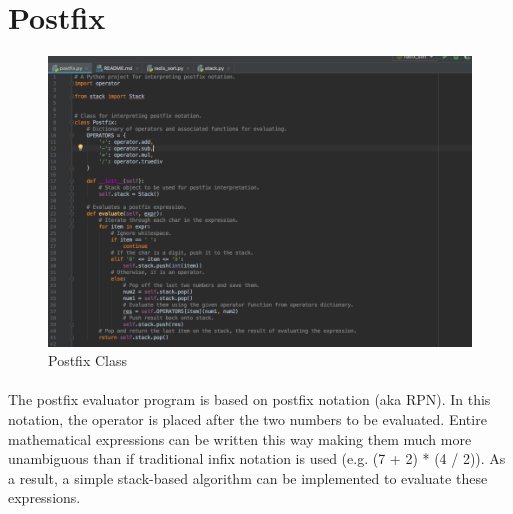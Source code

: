 \documentclass[10pt,letterpaper]{article}
\begin{document}
\section{Postfix}

\begin{figure}[H]
\centering
\includegraphics[width=\linewidth]{postfix_class.png}
\caption{Postfix Class}
\end{figure}

\paragraph{}
The postfix evaluator program is based on postfix notation (aka RPN). In this
notation, the operator is placed after the two numbers to be evaluated. Entire
mathematical expressions can be written this way making them much more
unambiguous than if traditional infix notation is used
(e.g. (7 + 2) * (4 / 2)). As a result, a simple stack-based algorithm can be
implemented to evaluate these expressions.
\end{document}
